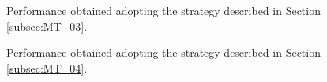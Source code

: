 \begin{figure}
	\centering
{} \quad
{} \quad
{} 
\caption{Performance obtained adopting the strategy described in Section \ref{subsec:MT_03}.}
\label{fig:res_copied}
\end{figure}
\begin{figure}
	\centering
{} \quad
{} \quad
{}
\caption{Performance obtained adopting the strategy described in Section \ref{subsec:MT_04}.}
\label{fig:res_ants}
\end{figure}
